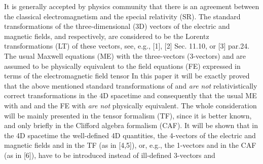\documentclass[a4paper,showpacs,preprintnumbers,amsmath,amssymb]{revtex4}
\begin{document}
It is generally accepted by physics community that there is an agreement
between the classical electromagnetism and the special relativity (SR). The
standard transformations of the three-dimensional (3D) vectors of the
electric and magnetic fields, \coordHE{} and \coordHE{} respectively,
are considered to be the Lorentz transformations (LT) of these vectors, see,
e.g., [1], [2] Sec. 11.10, or [3] par.24. The usual Maxwell equations (ME)
with the three-vectors (3-vectors) \coordHE{} and \coordHE{} are assumed
to be physically equivalent to the field equations (FE) expressed in terms
of the electromagnetic field tensor \coordHE{} In this paper it will be
exactly proved that the above mentioned standard transformations of \coordHE{} and \coordHE{} \emph{are not} relativistically correct transformations
in the 4D spacetime and consequently that the usual ME with \coordHE{} and
\coordHE{} and the FE with \coordHE{} \emph{are not} physically equivalent.
The whole consideration will be mainly presented in the tensor formalism
(TF), since it is better known, and only briefly in the Clifford algebra
formalism (CAF). It will be shown that in the 4D spacetime the well-defined
4D quantities, the 4-vectors of the electric and magnetic fields \coordHE{} and
\coordHE{} in the TF (as in [4,5]), or, e.g., the 1-vectors \coordHE{} and \coordHE{} in the
CAF (as in [6]), have to be introduced instead of ill-defined 3-vectors \coordHE{} and \coordHE{}
\end{document}
